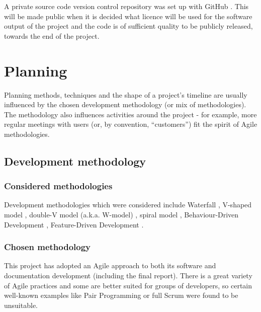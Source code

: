 \documentclass[11pt,fleqn,twoside]{article}
\begin{document}
A private source code version control repository was set up with GitHub \cite{github}. This will be made public when it is decided what licence will be used for the software output of the project and the code is of sufficient quality to be publicly released, towards the end of the project.


\section{Planning}

Planning methods, techniques and the shape of a project's timeline are usually influenced by the chosen development methodology (or mix of methodologies). The methodology also influences activities around the project - for example, more regular meetings with users (or, by convention, ``customers'') fit the spirit of Agile methodologies.

\subsection{Development methodology}

\subsubsection{Considered methodologies}
Development methodologies which were considered include Waterfall \cite{waterfall}, V-shaped model \cite{vmodel}, double-V model (a.k.a. W-model) \cite{wmodel}, spiral model \cite{spiral-model}, Behaviour-Driven Development \cite{bdd}, Feature-Driven Development \cite{fdd}.

\subsubsection{Chosen methodology}
\label{chosen-dev}
This project has adopted an Agile approach to both its software and documentation development (including the final report). There is a great variety of Agile practices and some are better suited for groups of developers, so certain well-known examples like Pair Programming \cite{pairprg} or full Scrum \cite{Scrum} were found to be unsuitable.
\end{document}
